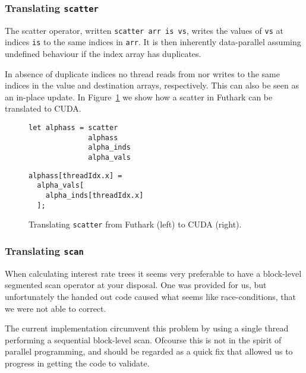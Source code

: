 \subsubsection{Translating \texttt{scatter}}

The scatter operator, written \lstinline{scatter arr is vs},
writes the values of \lstinline{vs} at indices
\lstinline{is} to the same indices in \lstinline{arr}. It is
then inherently data-parallel assuming undefined behaviour
if the index array has duplicates.

In absence of duplicate indices no thread reads from nor
writes to the same indices in the value and destination
arrays, respectively. This can also be seen as an in-place
update. In Figure~\ref{fig:trans_scatter} we show how a
scatter in Futhark can be translated to CUDA.
%
\begin{figure}[bt]
\begin{center}
\begin{minipage}[t]{0.45\linewidth}
\vspace{0pt}
\begin{lstlisting}
let alphass = scatter
              alphass
              alpha_inds
              alpha_vals
\end{lstlisting}
\end{minipage}
\begin{minipage}[t]{0.45\linewidth}
\vspace{0pt}
\begin{lstlisting}
alphass[threadIdx.x] =
  alpha_vals[
    alpha_inds[threadIdx.x]
  ];
\end{lstlisting}
\end{minipage}
\caption{Translating \texttt{scatter} from Futhark (left) to
  CUDA (right).}
\label{fig:trans_scatter}
\end{center}
\end{figure}


\subsubsection{Translating \texttt{scan}}

When calculating interest rate trees it seems very preferable to
have a block-level segmented scan operator at your disposal.
One was provided for us, but unfortunately the handed out code caused what
seems like race-conditions, that we were not able to correct.

The current implementation circumvent this problem by using
a single thread performing a sequential block-level scan.
Ofcourse this is not in the spirit of parallel programming,
and should be regarded as a quick fix that allowed us to progress
in getting the code to validate.


